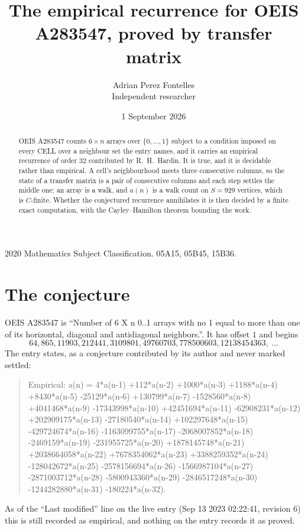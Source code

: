 \documentclass[11pt,a4paper]{article}
\title{The empirical recurrence for OEIS A283547, proved by transfer matrix}
\author{Adrian Perez Fontelles\\ \small Independent researcher}
\date{1 September 2026}
\theoremstyle{plain}
\theoremstyle{definition}
\begin{document}
\maketitle

\begin{abstract}
OEIS A283547 counts $6\times n$ arrays over $\{0,\dots,1\}$ subject to a condition imposed on
every CELL over a neighbour set the entry names, and it carries an empirical recurrence of
order $32$ contributed by R.~H.~Hardin. It is true, and it is decidable rather than
empirical. A cell's neighbourhood meets three consecutive columns, so the state of a transfer
matrix is a pair of consecutive columns and each step settles the middle one; an array is a
walk, and $a(n)$ is a walk count on $S=929$ vertices, which is $C$-finite. Whether the
conjectured recurrence annihilates it is then decided by a finite exact computation, with the
Cayley--Hamilton theorem bounding the work.
\end{abstract}

\noindent\small 2020 Mathematics Subject Classification. 05A15, 05B45, 15B36.\normalsize

\section{The conjecture}

OEIS A283547 is ``Number of 6 X n 0..1 arrays with no 1 equal to more than one of its horizontal, diagonal and antidiagonal neighbors.''. It has offset $1$ and begins
\[
64, 865, 11903, 212441, 3109801, 49760703, 778500603, 12138454363,\ \dots
\]
The entry states, as a conjecture contributed by its author and never marked settled:
\begin{quote}
Empirical: a(n) = 4*a(n-1) +112*a(n-2) +1000*a(n-3) +1188*a(n-4) +8430*a(n-5) -25129*a(n-6) +130799*a(n-7) -1528560*a(n-8) +4041468*a(n-9) -17343998*a(n-10) +42451694*a(n-11) -62908231*a(n-12) +202909175*a(n-13) -27180540*a(n-14) +102297648*a(n-15) -429724674*a(n-16) -1163099755*a(n-17) -2068007852*a(n-18) -2469159*a(n-19) -231955725*a(n-20) +1878145748*a(n-21) +2038664058*a(n-22) +7678354062*a(n-23) +3388259352*a(n-24) -128042672*a(n-25) -2578156694*a(n-26) -1566987104*a(n-27) -2871003712*a(n-28) -5800943360*a(n-29) -2846517248*a(n-30) -1244282880*a(n-31) -180224*a(n-32).
\end{quote}
As of the ``Last modified'' line on the live entry (Sep 13 2023 02:22:41, revision 6) this is still
recorded as empirical, and nothing on the entry records it as proved.
\end{document}
